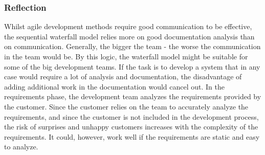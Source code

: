 \subsubsection{Reflection}
Whilst agile development methods require good communication to be effective, the sequential waterfall model relies more on good documentation analysis than on communication. Generally, the bigger the team - the worse the communication in the team would be. By this logic, the waterfall model might be suitable for some of the big development teams. If the task is to develop a system that in any case would require a lot of analysis and documentation, the disadvantage of adding additional work in the documentation would cancel out. In the requirements phase, the development team analyzes the requirements provided by the customer. Since the customer relies on the team to accurately analyze the requirements, and since the customer is not included in the development process, the risk of surprises and unhappy customers increases with the complexity of the requirements. It could, however, work well if the requirements are static and easy to analyze. 

